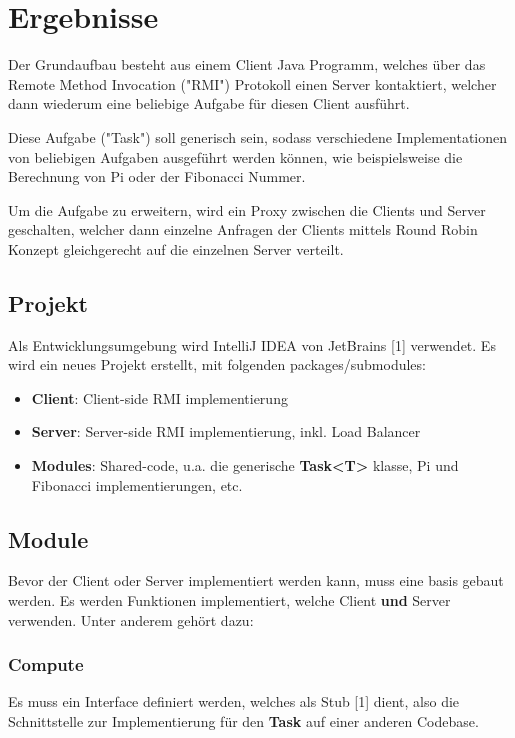 
\section{Ergebnisse}
\label{sec:Ergebnisse}

Der Grundaufbau besteht aus einem Client Java Programm, welches über das Remote Method Invocation ("RMI") Protokoll einen Server kontaktiert, welcher dann wiederum eine beliebige Aufgabe für diesen Client ausführt.

Diese Aufgabe ("Task") soll generisch sein, sodass verschiedene Implementationen von beliebigen Aufgaben ausgeführt werden können, wie beispielsweise die Berechnung von Pi oder der Fibonacci Nummer.

Um die Aufgabe zu erweitern, wird ein Proxy zwischen die Clients und Server geschalten, welcher dann einzelne Anfragen der Clients mittels Round Robin Konzept gleichgerecht auf die einzelnen Server verteilt.

\subsection{Projekt}
Als Entwicklungsumgebung wird IntelliJ IDEA von JetBrains [1] verwendet. Es wird ein neues Projekt erstellt, mit folgenden packages/submodules:
\begin{itemize}
    \item \textbf{Client}: Client-side RMI implementierung
    \item \textbf{Server}: Server-side RMI implementierung, inkl. Load Balancer
    \item \textbf{Modules}: Shared-code, u.a. die generische \textbf{Task<T>} klasse, Pi und Fibonacci implementierungen, etc.
\end{itemize}


\subsection{Module}
Bevor der Client oder Server implementiert werden kann, muss eine basis gebaut werden. Es werden Funktionen implementiert, welche Client \textbf{und} Server verwenden. Unter anderem gehört dazu:

\subsubsection{Compute}
Es muss ein Interface definiert werden, welches als Stub [1] dient, also die Schnittstelle zur Implementierung für den \textbf{Task} auf einer anderen Codebase.

